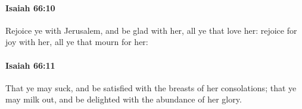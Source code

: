 		\paragraph{Isaiah 66:10} %
			\label{ISAIAH-66-10}

			Rejoice ye with Jerusalem, and be glad with her, all ye that love her: rejoice for joy with her, all ye that mourn for her:


		\paragraph{Isaiah 66:11} %
			\label{ISAIAH-66-11}

			That ye may suck, and be satisfied with the breasts of her consolations; that ye may milk out, and be delighted with the abundance of her glory.


